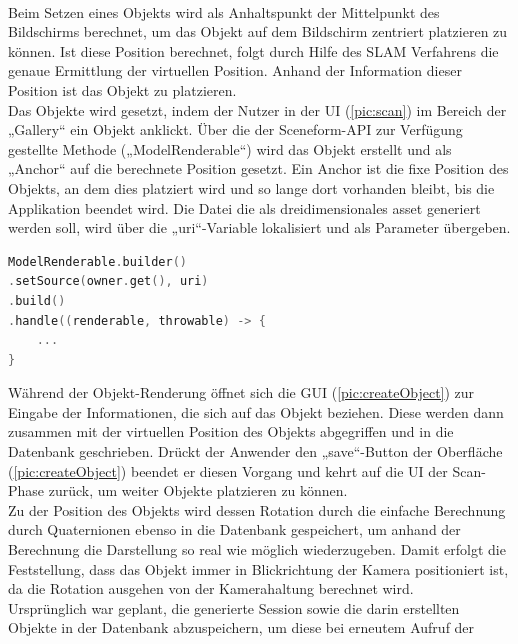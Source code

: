 \\ 
Beim Setzen eines Objekts wird als Anhaltspunkt der Mittelpunkt des Bildschirms berechnet, um das Objekt auf dem Bildschirm zentriert platzieren zu können. Ist 
diese Position berechnet, folgt durch Hilfe des \acs{SLAM} Verfahrens die genaue Ermittlung der virtuellen Position. Anhand der Information dieser Position 
ist das Objekt zu platzieren. 
\\ 
Das Objekte wird gesetzt, indem der Nutzer in der \acs{UI} (\ref{pic:scan}) im Bereich der „Gallery“ ein Objekt anklickt.
Über die der Sceneform-\acs{API} zur Verfügung gestellte Methode („ModelRenderable“) wird das Objekt erstellt und als „Anchor“ auf die berechnete Position 
gesetzt. Ein Anchor ist die fixe Position des Objekts, an dem dies platziert wird und so lange dort vorhanden bleibt, bis die Applikation beendet wird. Die Datei 
die als dreidimensionales asset generiert werden soll, wird über die „uri“-Variable lokalisiert und als Parameter übergeben. 
\begin{lstlisting}[language=C,
    frame=lines,           % Ein Rahmen um den Code (single for box, lines for top and bottom)
    xleftmargin=\parindent,  % Rahmen link von den Zahlen
    style=algoBericht,
    label={code:modelrenderable},
    captionpos=b,           % Caption unter den Code setzen
caption={ModelRenderable Builder}]
ModelRenderable.builder()
.setSource(owner.get(), uri)
.build()
.handle((renderable, throwable) -> {
    ...
}
\end{lstlisting}
Während der Objekt-Renderung öffnet sich die \acs{GUI} (\ref{pic:createObject}) zur Eingabe der Informationen, die sich auf das Objekt beziehen. Diese 
werden dann zusammen mit der virtuellen Position des Objekts abgegriffen und in die Datenbank geschrieben. Drückt der Anwender den „save“-Button der Oberfläche 
(\ref{pic:createObject}) beendet er diesen Vorgang und kehrt auf die \acs{UI} der Scan-Phase zurück, um weiter Objekte platzieren zu können. 
\\ 
Zu der Position des Objekts wird dessen Rotation durch die einfache Berechnung durch Quaternionen ebenso in die Datenbank gespeichert, um anhand der Berechnung 
die Darstellung so real wie möglich wiederzugeben. Damit erfolgt die Feststellung, dass das Objekt immer in Blickrichtung der Kamera positioniert ist, da die 
Rotation ausgehen von der Kamerahaltung berechnet wird. 
\\ 
\linebreak
Ursprünglich war geplant, die generierte Session sowie die darin erstellten Objekte in der Datenbank abzuspeichern, um diese bei erneutem Aufruf der 
